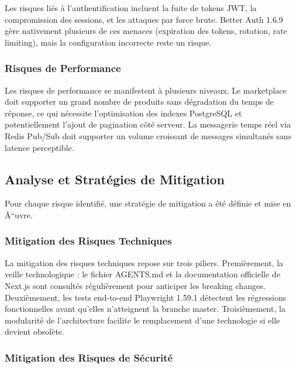 Les risques liés à l'authentification incluent la fuite de tokens JWT, la compromission des sessions, et les attaques par force brute. Better Auth 1.6.9 gère nativement plusieurs de ces menaces (expiration des tokens, rotation, rate limiting), mais la configuration incorrecte reste un risque.



\subsubsection{Risques de Performance}



Les risques de performance se manifestent à plusieurs niveaux. Le marketplace doit supporter un grand nombre de produits sans dégradation du temps de réponse, ce qui nécessite l'optimisation des indexes PostgreSQL et potentiellement l'ajout de pagination côté serveur. La messagerie temps réel via Redis Pub/Sub doit supporter un volume croissant de messages simultanés sans latence perceptible.



\subsection{Analyse et Stratégies de Mitigation}



Pour chaque risque identifié, une stratégie de mitigation a été définie et mise en Å“uvre.



\subsubsection{Mitigation des Risques Techniques}



La mitigation des risques techniques repose sur trois piliers. Premièrement, la veille technologique : le fichier AGENTS.md et la documentation officielle de Next.js sont consultés régulièrement pour anticiper les breaking changes. Deuxièmement, les tests end-to-end Playwright 1.59.1 détectent les régressions fonctionnelles avant qu'elles n'atteignent la branche master. Troisièmement, la modularité de l'architecture facilite le remplacement d'une technologie si elle devient obsolète.



\subsubsection{Mitigation des Risques de Sécurité}



